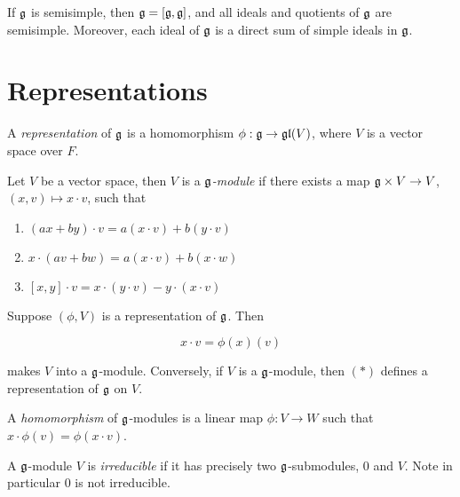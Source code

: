 \documentclass{article}
\begin{document}
\begin{corollary}
    If \(\mathfrak{g}\) is semisimple, then \(\mathfrak{g} = [\mathfrak{g},\mathfrak{g}]\), and all ideals and quotients of \(\mathfrak{g}\) are semisimple. Moreover, each ideal of \(\mathfrak{g}\) is a direct sum of simple ideals in \(\mathfrak{g}\).
\end{corollary}

\section{Representations}

\begin{definition}
    [representation] A \emph{representation} of \(\mathfrak{g}\) is a homomorphism \(\phi : \mathfrak{g} \to \mathfrak{g}\mathfrak{l}(V)\), where \(V\) is a vector space over \(F\).
\end{definition}

\begin{definition}
     Let \(V\) be a vector space, then \(V\) is a \emph{\(\mathfrak{g}\)-module} if there exists a map \(\mathfrak{g} \times V \to V\), \((x, v) \mapsto x\cdot v\), such that

    \begin{enumerate}
        \item \((ax + by)\cdot v = a(x\cdot v) + b(y\cdot v)\)
        \item \(x\cdot (av + bw) = a(x\cdot v) + b(x\cdot w)\)
        \item \([x, y]\cdot v = x\cdot(y\cdot v) - y\cdot(x\cdot v)\)
    \end{enumerate}
\end{definition}

\begin{proposition}
    Suppose \((\phi,V)\) is a representation of \(\mathfrak{g}\). Then

    \[x \cdot v = \phi(x)(v) \tag{*}\]

    makes \(V\) into a \(\mathfrak{g}\)-module. Conversely, if \(V\) is a \(\mathfrak{g}\)-module, then \((*)\) defines a representation of \(\mathfrak{g}\) on \(V\).
\end{proposition}

\begin{definition}
    [homomorphism] A \emph{homomorphism} of \(\mathfrak{g}\)-modules is a linear map \(\phi : V \to W\) such that \(x \cdot \phi(v) = \phi(x\cdot v)\).
\end{definition}

\begin{definition}
    [irreducible] A \(\mathfrak{g}\)-module \(V\) is \emph{irreducible} if it has precisely two \(\mathfrak{g}\)-submodules, \(0\) and \(V\). Note in particular \(0\) is not irreducible.
\end{definition}
\end{document}
